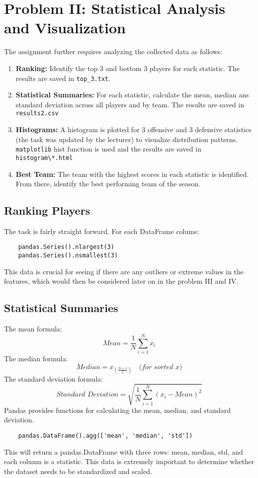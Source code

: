 \documentclass{report}
\begin{document}
\section{Problem II: Statistical Analysis and Visualization}
The assignment further requires analyzing the collected data as follows:
\begin{enumerate}
    \item \textbf{Ranking:} Identify the top 3 and bottom 3 players for each statistic. 
    The results are saved in \verb|top_3.txt|.
    \item \textbf{Statistical Summaries:} For each statistic, calculate the mean, median ans 
    standard deviation across all players and by team. The results are saved in \verb|results2.csv|
    \item \textbf{Histograms:} A histogram is plotted for 3 offensive and 3 defensive statistics
    (the task was updated by the lecturer) to visualize distribution patterns. \verb|matplotlib|
    hist function is used and the results are saved in \verb|histogram\*.html|
    \item \textbf{Best Team:} The team with the highest scores in each statistic is identified. 
    From there, identify the best performing team of the season.
\end{enumerate}

\subsection{Ranking Players}
The task is fairly straight forward. For each DataFrame colums:
\begin{verbatim}
    pandas.Series().nlargest(3) 
    pandas.Series().nsmallest(3) 
\end{verbatim}
This data is crucial for seeing if there are any outliers or extreme values in the features, which
would then be considered later on in the problem III and IV.

\subsection{Statistical Summaries}
The mean formula: 
\[Mean = \frac{1}{N} \sum_{i=1}^{N} x_i\]
The median formula: 
\[Median = x_{\left(\frac{N+1}{2}\right)} \quad \textit{(for sorted x)}\]
The standard deviation formula: 
\[\textit{Standard Deviation} = \sqrt{\frac{1}{N} \sum_{i=1}^{N} (x_i - Mean)^2}\]
Pandas provides functions for calculating the mean, median, and standard deviation.
\begin{verbatim}
    pandas.DataFrame().agg(['mean', 'median', 'std'])
\end{verbatim}
This will return a pandas.DataFrame with three rows: mean, median, std, and each column is a statistic.
This data is extremely important to determine whether the dataset needs to be standardized and 
scaled.
\end{document}
